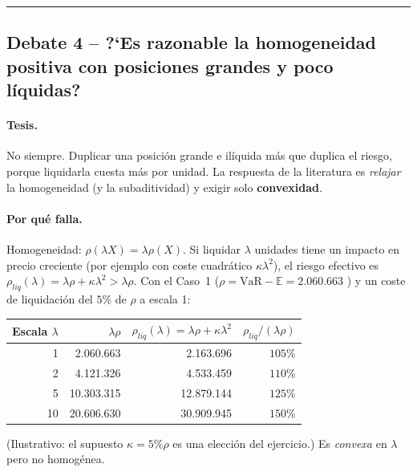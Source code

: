 \documentclass[a4paper,12pt]{article}
\newcommand{\euro}{\texteuro}
\newcommand{\E}{\mathbb{E}}
\newcommand{\VaR}{\mathrm{VaR}}
\begin{document}
\bigskip\hrule\bigskip

\subsection{Debate 4 -- ?`Es razonable la homogeneidad positiva con posiciones grandes y poco l\'iquidas?}

\paragraph{Tesis.} No siempre. Duplicar una posici\'on grande e il\'iquida m\'as que duplica el riesgo, porque liquidarla cuesta m\'as por unidad. La respuesta de la literatura es \emph{relajar} la homogeneidad (y la subaditividad) y exigir solo \textbf{convexidad}.

\paragraph{Por qu\'e falla.} Homogeneidad: $\rho(\lambda X)=\lambda\rho(X)$. Si liquidar $\lambda$ unidades tiene un impacto en precio creciente (por ejemplo con coste cuadr\'atico $\kappa\lambda^2$), el riesgo efectivo es $\rho_{liq}(\lambda)=\lambda\rho+\kappa\lambda^2>\lambda\rho$. Con el Caso~1 ($\rho=\VaR-\E=2.060.663$ \euro) y un coste de liquidaci\'on del $5\%$ de $\rho$ a escala 1:
\begin{center}
\small
\begin{tabular}{rrrr}
\toprule
Escala $\lambda$ & $\lambda\rho$ & $\rho_{liq}(\lambda)=\lambda\rho+\kappa\lambda^2$ & $\rho_{liq}/(\lambda\rho)$\\
\midrule
1 & 2.060.663 & 2.163.696 & $105\%$\\
2 & 4.121.326 & 4.533.459 & $110\%$\\
5 & 10.303.315 & 12.879.144 & $125\%$\\
10 & 20.606.630 & 30.909.945 & $150\%$\\
\bottomrule
\end{tabular}
\end{center}
(Ilustrativo: el supuesto $\kappa=5\%\rho$ es una elecci\'on del ejercicio.) Es \emph{convexa} en $\lambda$ pero no homog\'enea.
\end{document}
